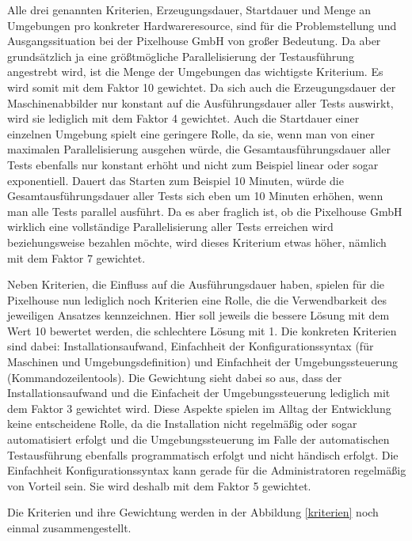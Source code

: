 Alle drei genannten Kriterien, Erzeugungsdauer, Startdauer und Menge an Umgebungen pro konkreter Hardwareresource, sind für die Problemstellung und Ausgangssituation bei der Pixelhouse GmbH von großer Bedeutung. Da aber grundsätzlich ja eine größtmögliche Parallelisierung der Testausführung angestrebt wird, ist die Menge der Umgebungen das wichtigste Kriterium. Es wird somit mit dem Faktor 10 gewichtet. Da sich auch die Erzeugungsdauer der Maschinenabbilder nur konstant auf die Ausführungsdauer aller Tests auswirkt, wird sie lediglich mit dem Faktor 4 gewichtet. Auch die Startdauer einer einzelnen Umgebung spielt eine geringere Rolle, da sie, wenn man von einer maximalen Parallelisierung ausgehen würde, die Gesamtausführungsdauer aller Tests ebenfalls nur konstant erhöht und nicht zum Beispiel linear oder sogar exponentiell. Dauert das Starten zum Beispiel 10 Minuten, würde die Gesamtausführungsdauer aller Tests sich eben um 10 Minuten erhöhen, wenn man alle Tests parallel ausführt. Da es aber fraglich ist, ob die Pixelhouse GmbH wirklich eine vollständige Parallelisierung aller Tests erreichen wird beziehungsweise bezahlen möchte, wird dieses Kriterium etwas höher, nämlich mit dem Faktor 7 gewichtet.

Neben Kriterien, die Einfluss auf die Ausführungsdauer haben, spielen für die Pixelhouse nun lediglich noch Kriterien eine Rolle, die die Verwendbarkeit des jeweiligen Ansatzes kennzeichnen. Hier soll jeweils die bessere Lösung mit dem Wert 10 bewertet werden, die schlechtere Lösung mit 1. Die konkreten Kriterien sind dabei: Installationsaufwand, Einfachheit der Konfigurationssyntax (für Maschinen und Umgebungsdefinition) und Einfachheit der Umgebungssteuerung (Kommandozeilentools). Die Gewichtung sieht dabei so aus, dass der Installationsaufwand und die Einfacheit der Umgebungssteuerung lediglich mit dem Faktor 3 gewichtet wird. Diese Aspekte spielen im Alltag der Entwicklung keine entscheidene Rolle, da die Installation nicht regelmäßig oder sogar automatisiert erfolgt und die Umgebungssteuerung im Falle der automatischen Testausführung ebenfalls programmatisch erfolgt und nicht händisch erfolgt. Die Einfachheit Konfigurationssyntax kann gerade für die Administratoren regelmäßig von Vorteil sein. Sie wird deshalb mit dem Faktor 5 gewichtet. 

Die Kriterien und ihre Gewichtung werden in der Abbildung \ref{kriterien} noch einmal zusammengestellt.

